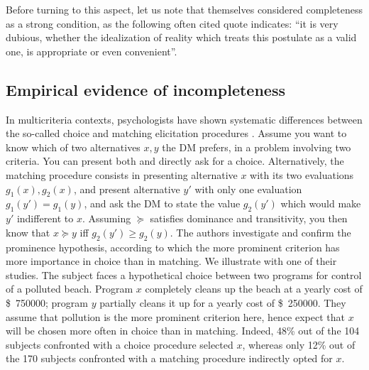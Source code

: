 \documentclass[french, english]{llncs}
\newcommand{\dollars}[1]{\SI{#1}[\$]{}}
\begin{document}
	Before turning to this aspect, let us note that \citet[p. 630]{von_neumann_theory_1953} \citep[also]{von_neumann_theory_2004} themselves considered completeness as a strong condition, as the following often cited quote indicates: “it is very dubious, whether the idealization of reality which treats this postulate as a valid one, is appropriate or even convenient”.

	\subsection{Empirical evidence of incompleteness}
	In multicriteria contexts, psychologists have shown systematic differences between the so-called choice and matching elicitation procedures \citep{tversky_contingent_1988}. Assume you want to know which of two alternatives $x, y$ the \ac{DM} prefers, in a problem involving two criteria. You can present both and directly ask for a choice. Alternatively, the matching procedure consists in presenting alternative $x$ with its two evaluations $g_1(x), g_2(x)$, and present alternative $y'$ with only one evaluation $g_1(y') = g_1(y)$, and ask the \ac{DM} to state the value $g_2(y')$ which would make $y'$ indifferent to $x$. Assuming $\succeq$ satisfies dominance and transitivity, you then know that $x \succeq y$ iff $g_2(y') ≥ g_2(y)$. The authors investigate and confirm the prominence hypothesis, according to which the more prominent criterion has more importance in choice than in matching. We illustrate with one of their studies. The subject faces a hypothetical choice between two programs for control of a polluted beach. Program $x$ completely cleans up the beach at a yearly cost of \dollars{750 000}; program $y$ partially cleans it up for a yearly cost of \dollars{250 000}. They assume that pollution is the more prominent criterion here, hence expect that $x$ will be chosen more often in choice than in matching. Indeed, 48\% out of the 104 subjects confronted with a choice procedure selected $x$, whereas only 12\% out of the 170 subjects confronted with a matching procedure indirectly opted for $x$.
	
\end{document}
